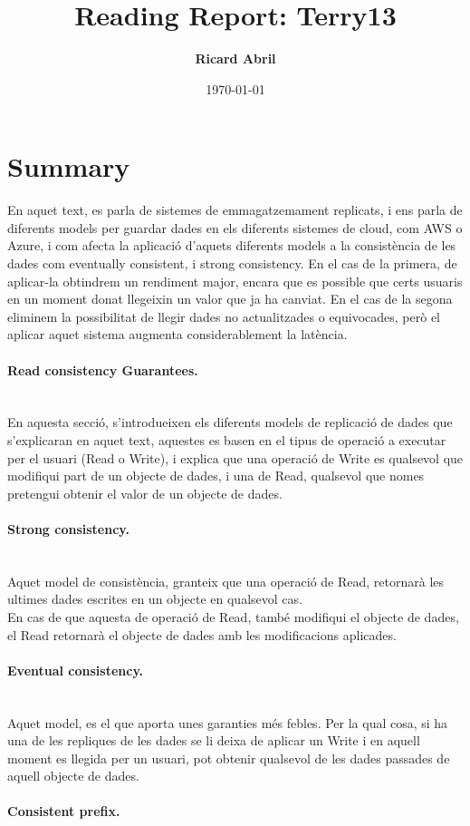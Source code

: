 \documentclass[a4paper, 10pt]{article}
\title{Reading Report: Terry13}
\author{\textbf{Ricard Abril}}
\date{\normalsize\today{}}
\begin{document}
\maketitle


\section{Summary}

En aquet text, es parla de sistemes de emmagatzemament replicats, i ens parla de diferents models per guardar dades en els diferents sistemes de cloud, com AWS o Azure, i com afecta la aplicació d'aquets diferents models a la consistència de les dades com eventually consistent, i strong consistency.
En el cas de la primera, de aplicar-la obtindrem un rendiment major, encara que es possible que certs usuaris en un moment donat llegeixin un valor que ja ha canviat.
En el cas de la segona eliminem la possibilitat de llegir dades no actualitzades o equivocades, però el aplicar aquet sistema augmenta considerablement la latència.

\paragraph{Read consistency Guarantees.\\\\}
En aquesta secció, s'introdueixen els diferents models de replicació de dades que s'explicaran en aquet text, aquestes es basen en el tipus de operació a executar per el usuari (Read o Write), i explica que una operació de Write es qualsevol que modifiqui part de un objecte de dades, i una de Read, qualsevol que nomes pretengui obtenir el valor de un objecte de dades.


\paragraph{Strong consistency.\\\\}
Aquet model de consistència, granteix que una operació de Read, retornarà les ultimes dades escrites en un objecte en qualsevol cas.\\
En cas de que aquesta de operació de Read, també modifiqui el objecte de dades, el Read retornarà el objecte de dades amb les modificacions aplicades.

\paragraph{Eventual consistency.\\\\}
Aquet model, es el que aporta unes garanties més febles. Per la qual cosa, si ha una de les repliques de les dades se li deixa de aplicar un Write i en aquell moment es llegida per un usuari, pot obtenir qualsevol de les dades passades de aquell objecte de dades.
\newpage\paragraph{Consistent prefix.\\\\}
\end{document}
